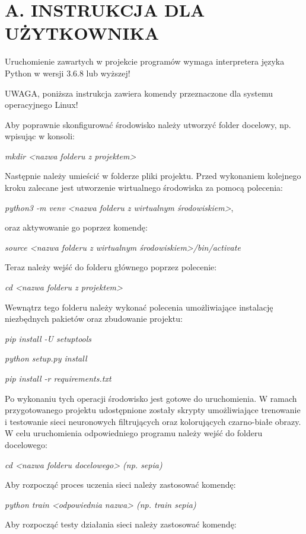 \section*{A. INSTRUKCJA DLA UŻYTKOWNIKA}

  Uruchomienie zawartych w projekcie programów wymaga interpretera
  języka Python w wersji 3.6.8 lub wyższej!

  UWAGA, poniższa instrukcja zawiera komendy przeznaczone dla systemu operacyjnego
  Linux!

  Aby poprawnie skonfigurować środowisko należy utworzyć folder docelowy, np.
  wpisując w konsoli:

  \textit{mkdir <nazwa folderu z projektem>}

  Następnie należy umieścić w folderze pliki projektu. Przed wykonaniem
  kolejnego kroku zalecane jest utworzenie wirtualnego środowiska za pomocą
  polecenia:

  \textit{python3 -m venv <nazwa folderu z wirtualnym środowiskiem>},

  oraz aktywowanie go poprzez komendę:

  \textit{source <nazwa folderu z wirtualnym środowiskiem>/bin/activate}

  Teraz należy wejść do folderu głównego poprzez polecenie:

  \textit{cd <nazwa folderu z projektem>}

  Wewnątrz tego folderu należy wykonać polecenia umożliwiające instalację niezbędnych
  pakietów oraz zbudowanie projektu:

  \textit{pip install -U setuptools}

  \textit{python setup.py install}

  \textit{pip install -r requirements.txt}

  Po wykonaniu tych operacji środowisko jest gotowe do uruchomienia. W ramach
  przygotowanego projektu udostępnione zostały skrypty umożliwiające trenowanie
  i testowanie sieci neuronowych filtrujących oraz kolorujących czarno-białe
  obrazy. W celu uruchomienia odpowiedniego programu należy wejść do folderu
  docelowego:

  \textit{cd <nazwa folderu docelowego> (np. sepia)}

  Aby rozpocząć proces uczenia sieci należy zastosować komendę:

  \textit{python train <odpowiednia nazwa> (np. train sepia)}

  Aby rozpocząć testy działania sieci należy zastosować komendę:

